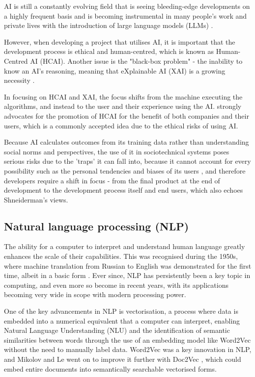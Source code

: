 \documentclass[12pt]{report}
\begin{document}
    AI is still a constantly evolving field that is seeing bleeding-edge developments on a 
    highly frequent basis and is becoming instrumental in many people's work and private lives 
    with the introduction of large language models (LLMs) \autocite{AIDigitalAssistants}.


    However, when developing a project that utilises AI, it is important that the development process
    is ethical and human-centred, which is known as Human-Centred AI (HCAI). 
    Another issue is the "black-box problem" - the inability to know an AI's reasoning, meaning that 
    eXplainable AI (XAI) is a growing necessity \autocite{miro-nicolau_comprehensive_2025}. 
    
    In focusing on HCAI and XAI, the focus shifts from the machine executing the algorithms, and instead to the user and their experience 
    using the AI. \textcite{AIEthics} strongly advocates for the 
    promotion of HCAI for the benefit of both companies and their users, which is a commonly accepted 
    idea due to the ethical risks of using AI. 
    
    Because AI calculates outcomes from its training data rather 
    than understanding social norms and perspectives, the use of it in sociotechnical systems poses serious risks 
    due to the 'traps' it can fall into, because it cannot account for every possibility such as the personal tendencies 
    and biases of its users \autocite{selbst_fairness_2019}, and therefore developers require a shift in focus - from the final product
    at the end of development to the development process itself and end users, which also echoes Shneiderman's views. 

    \subsection{Natural language processing (NLP)}
    The ability for a computer to interpret and understand human language greatly enhances the scale of their capabilities. This was 
    recognised during the 1950s, where machine translation from Russian to English was demonstrated for the first time, albeit in a basic form \autocite{zampolli_natural_1994}.
    Ever since, NLP has persistently been a key topic in computing, and even more so become in recent years, with its applications becoming very wide 
    in scope with modern processing power.

    One of the key advancements in NLP is vectorisation, a process where data is embedded into a numerical equivalent that a computer can interpret, 
    enabling Natural Language Understanding (NLU) and the identification of semantic similarities between words through the use of an embedding model 
    like Word2Vec \autocite{mikolov_efficient_2013} without the need to manually label data. 
    Word2Vec was a key innovation in NLP, and Mikolov and Le went on to improve it further with Doc2Vec \autocite{le_distributed_2014}, which could embed 
    entire documents into semantically searchable vectorised forms.
    
\end{document}
